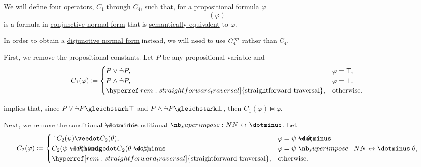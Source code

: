 \begin{algorithm}\label{alg:cnf_and_dnf}
  We will define four operators, \( C_1 \) through \( C_4 \), such that, for a \hyperref[def:propositional_grammar_schema/formula]{propositional formula} \( \varphi \)
  \begin{equation*}
    [C_4 \bincirc C_3 \bincirc C_2 \bincirc C_1](\varphi)
  \end{equation*}
  is a formula in \hyperref[def:cnf_and_dnf]{conjunctive normal form} that is \hyperref[def:propositional_entailment/equivalence]{semantically equivalent} to \( \varphi \).

  In order to obtain a \hyperref[def:cnf_and_dnf]{disjunctive normal form} instead, we will need to use \( C_4^{op} \) rather than \( C_4 \).

  \begin{thmenum}
     First, we remove the propositional constants. Let \( P \) be any propositional variable and
    \begin{equation*}
      C_1(\varphi) \coloneqq \begin{cases}
        P \vee \synneg P,                                                        &\varphi = \top, \\
        P \wedge \synneg P,                                                      &\varphi = \bot, \\
        \hyperref[rem:straightforward_traversal]{\T{straightforward traversal}}, &\T{otherwise.}
      \end{cases}
    \end{equation*}

     implies that, since \( P \vee \synneg P \gleichstark \top \) and \( P \wedge \synneg P \gleichstark \bot \), then \( C_1(\varphi) \gleichstark \varphi \).

     Next, we remove the conditional \( \synimplies \) and biconditional \( \syniff \). Let
    \begin{equation*}
      C_2(\varphi) \coloneqq \begin{cases}
        \synneg C_2(\psi) \synvee C_2(\theta),                                   &\varphi = \psi \synimplies \theta, \\
        C_2(\psi \synimplies \theta) \synwedge C_2(\theta \synimplies \psi),     &\varphi = \psi \syniff \theta, \\
        \hyperref[rem:straightforward_traversal]{\T{straightforward traversal}}, &\T{otherwise.}
      \end{cases}
    \end{equation*}


\end{thmenum}
\end{algorithm}
